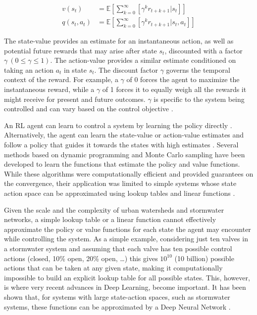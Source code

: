\begin{align}
	v(s_t) &= \mathbb{E} \left[\sum_{k=0}^\infty \left[\gamma^k r_{t+k+1} \Big| s_t\right] \right] \\
	q(s_t,a_t) &= \mathbb{E} \left[\sum_{k=0}^\infty \left[\gamma^k r_{t+k+1} \Big| s_t, a_t\right] \right]
\end{align}

The state-value provides an estimate for an instantaneous action, as well as potential future rewards that may arise after state $s_t$, discounted with a factor $\gamma\ (0 \leq \gamma \leq 1)$.
The action-value provides a similar estimate conditioned on taking an action $a_t$ in state $s_t$.
The discount factor $\gamma$ governs the temporal context of the reward.
For example, a $\gamma$ of 0 forces the agent to maximize the instantaneous reward, while a $\gamma$ of 1 forces it to equally weigh all the rewards it might receive for present and future outcomes.
$\gamma$ is specific to the system being controlled and can vary based on the control objective \cite{Sutton98}.

An RL agent can learn to control a system by learning the policy directly \cite{sutton2000policy}.
Alternatively, the agent can learn the state-value or action-value estimates and follow a policy that guides it towards the states with high estimates \cite{Sutton98}.
Several methods based on dynamic programming \cite{Watkins1992Q-learning, sutton1991planning} and Monte Carlo sampling \cite{Sutton98} have been developed to learn the functions that estimate the policy and value functions.
While these algorithms were computationally efficient and provided guarantees on the convergence, their application was limited to simple systems whose state action space can be approximated using lookup tables and linear functions \cite{Sutton98,Mnih2013PlayingLearning}.

Given the scale and the complexity of urban watersheds and stormwater networks, a simple lookup table or a linear  function cannot effectively approximate the policy or value functions for each state the agent may encounter while controlling the system.
As a simple example, considering just ten valves in a stormwater system and assuming that each valve has ten possible control actions (closed, 10\% open, 20\% open, \ldots) this gives $10^{10}$ (10 billion) possible actions that can be taken at any given state, making it computationally impossible to build an explicit lookup table for all possible states.
This, however, is where very recent advances in Deep Learning, become important.
It has been shown that, for systems with large state-action spaces, such as stormwater systems, these functions can be approximated by a Deep Neural Network  \cite{Sutton98,Mnih2015}.

